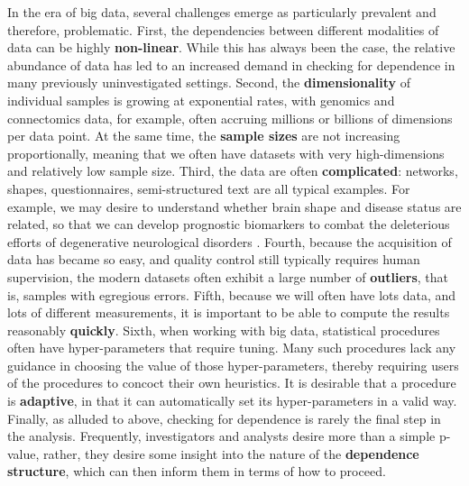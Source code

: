 \documentclass[11pt]{article}
\begin{document}
In the era of big data, several challenges emerge as particularly prevalent and therefore, problematic. 
% 
First, the dependencies between different modalities of data can be highly \textbf{non-linear}.  While this has always been the case, the relative abundance of data has led to an increased demand in checking for dependence in many previously uninvestigated settings.
% 
Second, the \textbf{dimensionality} of individual samples is growing at exponential rates, with genomics and connectomics data, for example, often accruing millions or billions of dimensions per data point. At the same time, the \textbf{sample sizes} are not increasing proportionally, meaning that we often have datasets with very high-dimensions and relatively low sample size.
% 
Third, the data are often \textbf{complicated}: networks, shapes, questionnaires, semi-structured text are all typical examples. 
For example, we may desire to understand whether brain shape and  disease status are related, so that we can develop prognostic biomarkers to combat the deleterious efforts of degenerative neurological disorders \cite{??}. 
% 
Fourth, because the acquisition of data has became so easy, and quality control still typically requires human supervision, the  modern datasets often exhibit a large number of \textbf{outliers}, that is, samples with egregious errors.
% 
Fifth, because we will often have lots data, and lots of different measurements, it is important to be able to compute the results reasonably \textbf{quickly}.
% 
Sixth, when working with big data, statistical procedures often have hyper-parameters that require tuning.  Many such procedures lack any guidance in choosing the value of those hyper-parameters, thereby requiring users of the procedures to concoct their own heuristics. It is desirable that a procedure is \textbf{adaptive}, in that it can automatically set its hyper-parameters in a valid way.
% 
Finally, as alluded to above, checking for dependence is rarely the final step in the analysis.  Frequently, investigators and analysts desire more than a simple p-value, rather, they desire some insight into the nature of the \textbf{dependence structure}, which can then inform them in terms of how to proceed.
\end{document}
